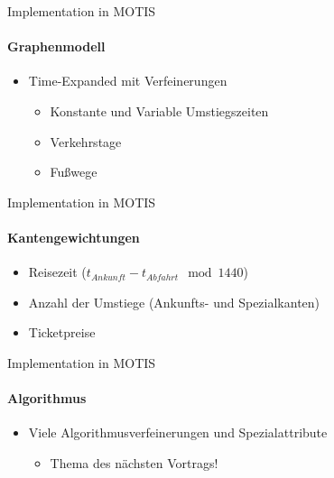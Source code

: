 \begin{frame}{Implementation in MOTIS}
	\framesubtitle{Graphenmodell}
	\begin{itemize}
		\item Time-Expanded mit Verfeinerungen
		\begin{itemize}
			\item Konstante und Variable Umstiegszeiten
			\item Verkehrstage
			\item Fußwege
		\end{itemize}
	\end{itemize}
\end{frame}

\begin{frame}{Implementation in MOTIS}
	\framesubtitle{Kantengewichtungen}

	\begin{itemize}
		\item Reisezeit ($t_{Ankunft} - t_{Abfahrt} \mod 1440$)
		\item Anzahl der Umstiege (Ankunfts- und Spezialkanten)
		\item Ticketpreise
	\end{itemize}
\end{frame}


\begin{frame}{Implementation in MOTIS}
	\framesubtitle{Algorithmus}

	\begin{itemize}
		\item Viele Algorithmusverfeinerungen und Spezialattribute
		\begin{itemize}
			\item Thema des nächsten Vortrags!
		\end{itemize}
	\end{itemize}
\end{frame}